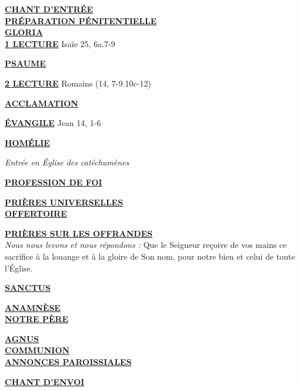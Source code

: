 \documentclass[french,11pt]{article}
\newcommand*{\chants}{../chants}
\newcommand*{\messe}{../messe_du_peuple_de_dieu}
\newcommand*{\pu}{../pu}
\newcommand*{\psaumes}{../psaumes}
\newcommand{\NewsItem}[1]{%
\vspace{3pt}
\underline{\textbf{#1}}
		  }
\begin{document}
\NewsItem{CHANT D'ENTRÉE}\\
	

\NewsItem{PRÉPARATION PÉNITENTIELLE}\\
	

\NewsItem{GLORIA}\\
	


\NewsItem{1\iere{} LECTURE} Isaïe 25, 6a.7-9

\NewsItem{PSAUME}


\NewsItem{2\ieme{} LECTURE} Romains (14, 7-9.10c-12)

\NewsItem{ACCLAMATION}


\NewsItem{ÉVANGILE} Jean 14, 1-6

\NewsItem{HOMÉLIE}

\emph{Entrée en Église des catéchumènes}

\NewsItem{PROFESSION DE FOI}


\NewsItem{PRIÈRES UNIVERSELLES}\\

%
%
%
%

\NewsItem{OFFERTOIRE}

\NewsItem{PRIÈRES SUR LES OFFRANDES}\\
\textit{Nous nous levons et nous répondons : }
Que le Seigneur reçoive de vos mains ce sacrifice à la louange et à la gloire
de Son nom, pour notre bien et celui de toute l’Église.


\NewsItem{SANCTUS}


\NewsItem{ANAMNÈSE}\\


\NewsItem{NOTRE PÈRE}

\NewsItem{AGNUS} \\


\NewsItem{COMMUNION}\\ 


\NewsItem{ANNONCES PAROISSIALES}


\NewsItem{CHANT D'ENVOI}\\

\end{document}
